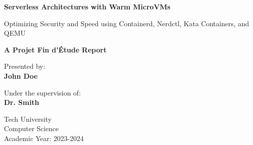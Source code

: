 \documentclass[12pt,a4paper]{report}
\begin{document}
\begin{titlepage}
    \begin{center}
        \vspace*{1cm}

        \Huge
        \textbf{Serverless Architectures with Warm MicroVMs}

        \vspace{0.5cm}
        \LARGE
        Optimizing Security and Speed using Containerd, Nerdctl, Kata Containers, and QEMU

        \vspace{1.5cm}

        \textbf{A Projet Fin d'\'Etude Report}

        \vfill

        \Large
        Presented by:\\
        \textbf{John Doe}

        \vspace{0.8cm}

        Under the supervision of:\\
        \textbf{Dr. Smith}

        \vspace{1.5cm}

        \Large
        Tech University\\
        Computer Science\\
        Academic Year: 2023-2024

    \end{center}
\end{titlepage}

\begin{abstract}
The rise of serverless computing has transformed modern software architecture, offering abstract infrastructure and pay-as-you-go pricing. However, standard container-based architectures face a critical challenge: cold starts, which degrade performance, and container escapes, which compromise security. Virtual Machines (VMs) provide stronger isolation but suffer from slow initialization times. This project addresses these issues by proposing a novel serverless service leveraging containerd, nerdctl, Kata Containers, and QEMU. To achieve both speed and security, similar to AWS Firecracker, we implement a "warm up" strategy where microVMs are pre-provisioned, kept in a paused state, and then unpaused for function invocations. This approach eliminates cold starts while maintaining the robust security isolation of hardware virtualization. This report details the architecture, implementation, and provides a comparative benchmark against AWS Firecracker, demonstrating the viability of paused Kata containers for high-performance serverless workloads.
\end{abstract}
\end{document}

